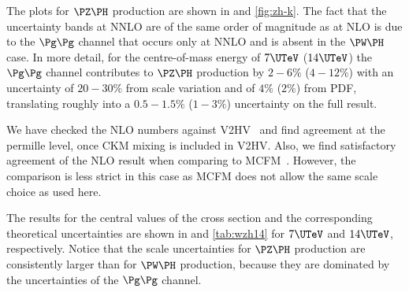 The plots for $\PZ\PH$ production are shown in 
and \ref{fig:zh-k}. The fact that the uncertainty bands at NNLO are of
the same order of magnitude as at NLO is due to the $\Pg\Pg$ channel
that occurs only at NNLO and is absent in the $\PW\PH$ case.
In more detail, for the centre-of-mass energy of $7\UTeV$ ($14\UTeV$) the
$\Pg\Pg$ channel contributes to $\PZ\PH$ production by
$2{-}6\%$ ($4{-}12\%$) with an uncertainty of 
$20{-}30\%$ from scale variation and of $4\%$ ($2\%$) from PDF, 
translating roughly into a $0.5{-}1.5\%$
($1{-}3\%$) uncertainty on the full result.

We have checked the NLO numbers against {\sc V2HV}~\cite{V2HV} and find
agreement at the permille level, once CKM mixing is included in {\sc
  V2HV}. Also, we find satisfactory agreement of the NLO result when
comparing to {\sc MCFM}~\cite{MCFM}. However, the comparison is less strict in
this case as {\sc MCFM} does not allow the same scale choice as used here.

The results for the central values of the cross section and the
corresponding theoretical uncertainties are shown in
 and \ref{tab:wzh14} for $7\UTeV$ and $14\UTeV$,
respectively. Notice that the scale uncertainties for $\PZ\PH$ production
are consistently larger than for $\PW\PH$ production, because they are
dominated by the uncertainties of the $\Pg\Pg$ channel.

